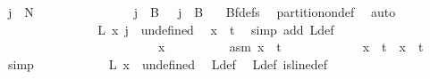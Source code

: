 \begin{isabellebody}
\ {\isachardoublequoteopen}j\ {\isasymnotin}\ {\isacharbraceleft}{\kern0pt}{\isachardot}{\kern0pt}{\isachardot}{\kern0pt}{\isacharless}{\kern0pt}N{\isacharprime}{\kern0pt}{\isacharbraceright}{\kern0pt}{\isachardoublequoteclose}\isanewline
\ \ \ \ \ \ \ \ \ \ \ \ \isamarkupfalse%
\ \isamarkupfalse%
\ {\isachardoublequoteopen}j\ {\isasymnotin}\ {\isacharparenleft}{\kern0pt}B\ {}{\isacharparenright}{\kern0pt}\ {\isasymand}\ j\ {\isasymnotin}\ B\ {}{\isachardoublequoteclose}\ \isamarkupfalse%
\ Bf{\isacharunderscore}{\kern0pt}defs\ \isamarkupfalse%
\ partition{\isacharunderscore}{\kern0pt}on{\isacharunderscore}{\kern0pt}def\ \isamarkupfalse%
\ auto\isanewline
\ \ \ \ \ \ \ \ \ \ \ \ \isamarkupfalse%
\ \isamarkupfalse%
\ {\isachardoublequoteopen}L{\isacharprime}{\kern0pt}\ x\ j\ {\isacharequal}{\kern0pt}\ undefined{\isachardoublequoteclose}\ \isamarkupfalse%
\ {\isacartoucheopen}x\ {\isacharequal}{\kern0pt}\ t{\isacartoucheclose}\ \isamarkupfalse%
\ {\isacharparenleft}{\kern0pt}simp\ add{\isacharcolon}{\kern0pt}\ L{\isacharprime}{\kern0pt}{\isacharunderscore}{\kern0pt}def{\isacharparenright}{\kern0pt}\isanewline
\ \ \ \ \ \ \ \ \ \ \isamarkupfalse%
\isanewline
\ \ \ \ \ \ \ \ \isamarkupfalse%
\isanewline
\ \ \ \ \ \ \isamarkupfalse%
\isanewline
\ \ \ \ \ \ \ \ \isamarkupfalse%
\ x\isanewline
\ \ \ \ \ \ \ \ \isamarkupfalse%
\ asm{\isacharcolon}{\kern0pt}\ {\isachardoublequoteopen}x\ {\isasymnotin}\ {\isacharbraceleft}{\kern0pt}{\isachardot}{\kern0pt}{\isachardot}{\kern0pt}{\isacharless}{\kern0pt}t{\isacharplus}{\kern0pt}{}{\isacharbraceright}{\kern0pt}{\isachardoublequoteclose}\ \isanewline
\ \ \ \ \ \ \ \ \isamarkupfalse%
\ \isamarkupfalse%
\ {\isachardoublequoteopen}x\ {\isasymnotin}\ {\isacharbraceleft}{\kern0pt}{\isachardot}{\kern0pt}{\isachardot}{\kern0pt}{\isacharless}{\kern0pt}t{\isacharbraceright}{\kern0pt}\ {\isasymand}\ x\ {\isasymnoteq}\ t{\isachardoublequoteclose}\ \isamarkupfalse%
\ simp\isanewline
\ \ \ \ \ \ \ \ \isamarkupfalse%
\ \isamarkupfalse%
\ {\isachardoublequoteopen}L{\isacharprime}{\kern0pt}\ x\ {\isacharequal}{\kern0pt}\ undefined{\isachardoublequoteclose}\ \isamarkupfalse%
\ L{\isacharunderscore}{\kern0pt}def\ \isamarkupfalse%
\ L{\isacharprime}{\kern0pt}{\isacharunderscore}{\kern0pt}def\ is{\isacharunderscore}{\kern0pt}line{\isacharunderscore}{\kern0pt}def\ \isamarkupfalse%

\end{isabellebody}

